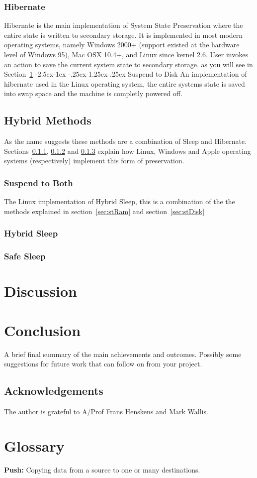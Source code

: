 \documentclass[a4,12pt]{article}
\makeatletter
\renewcommand\paragraph{\@startsection{paragraph}{4}{\z@}%
{-2.5ex\@plus -1ex \@minus -.25ex}%
{1.25ex \@plus .25ex}%
{\normalfont\normalsize\bfseries}}
\makeatother
\begin{document}
\subsubsection{Hibernate}
Hibernate is the main implementation of System State Preservation where the entire state is written to secondary storage. It is implemented in most modern operating systems, namely Windows 2000+ (support existed at the hardware level of Windows 95), Mac OSX 10.4+, and Linux since kernel 2.6.
User invokes an action to save the current system state to secondary storage.
as you will see in Section~\ref{sec:discussion}
\paragraph{Suspend to Disk}\label{sec:stDisk}
An implementation of hibernate used in the Linux operating system, the entire systems state is saved into swap space and the machine is completly powered off.\citep{Wiki}
\subsection{Hybrid Methods}
As the name suggests these methods are a combination of Sleep and Hibernate. Sections~\ref{sec:stb}, \ref{sec:hybridsleep} and \ref{sec:safesleep} explain how Linux, Windows and Apple operating systems (respectively) implement this form of preservation.
\subsubsection{Suspend to Both}\label{sec:stb}
The Linux implementation of Hybrid Sleep, this is a combination of the the methods explained in section~\ref{sec:stRam} and section~\ref{sec:stDisk}
\subsubsection{Hybrid Sleep}\label{sec:hybridsleep}
\subsubsection{Safe Sleep}\label{sec:safesleep}
\section{Discussion}\label{sec:discussion}
%
\section{Conclusion}
%
A brief final summary of the main achievements and outcomes. Possibly some suggestions for future work that can follow on from your project.%
%
\subsection*{Acknowledgements}
The author is grateful to A/Prof Frans Henskens and Mark Wallis.
\section{Glossary}
\textbf{Push:} Copying data from a source to one or many destinations. 
\textbf{ }
%

\vskip 0.2in


\end{document}
